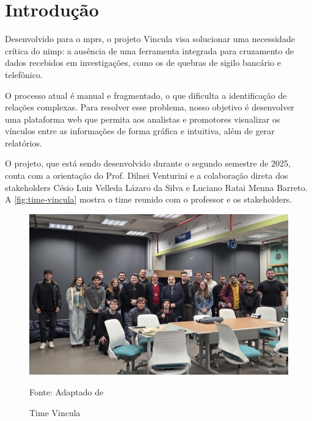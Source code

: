 \section[Introdução]{Introdução}
Desenvolvido para o \ac{mprs}, o projeto Vincula visa solucionar uma necessidade crítica do \ac{nimp}: a ausência de uma ferramenta integrada para cruzamento de dados recebidos em investigações, como os de quebras de sigilo bancário e telefônico.

O processo atual é manual e fragmentado, o que dificulta a identificação de relações complexas. Para resolver esse problema, nosso objetivo é desenvolver uma plataforma web que permita aos analistas e promotores visualizar os vínculos entre as informações de forma gráfica e intuitiva, além de gerar relatórios.

O projeto, que está sendo desenvolvido durante o segundo semestre de 2025, conta com a orientação do Prof. Dilnei Venturini e a colaboração direta dos stakeholders Césio Luiz Velleda Lázaro da Silva e Luciano Ratai Menna Barreto. A \autoref{fig:time-vincula} mostra o time reunido com o professor e os stakeholders.

\begin{figure}[H]
    \centering
    \small
    \includegraphics[width=1\linewidth]{conteudo//2 - ages I//conteudo//figures//foto-time.jpg}
    \caption{Time Vincula}
    Fonte: Adaptado de \textcites{wiki-vincula}
    \label{fig:time-vincula}
\end{figure}